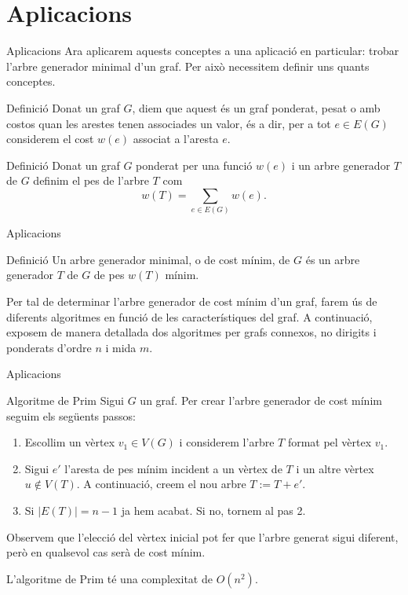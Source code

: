 \documentclass{beamer}
\begin{document}
\section{Aplicacions}
\begin{frame}{Aplicacions}
    Ara aplicarem aquests conceptes a una aplicació en particular: trobar l'arbre generador minimal d'un graf. Per això necessitem definir uns quants conceptes.\pause
    \begin{block}{Definició}
        Donat un graf $G$, diem que aquest és un graf ponderat, pesat o amb costos quan les arestes tenen associades un valor, és a dir, per a tot $e\in E(G)$ considerem el cost $w(e)$ associat a l'aresta $e$.
    \end{block}\pause
    \begin{block}{Definició}
        Donat un graf $G$ ponderat per una funció $w(e)$ i un arbre generador $T$ de $G$ definim el pes de l’arbre $T$ com $$w(T)=\sum_{e\in E(G)} w(e).$$
    \end{block}
\end{frame}
\begin{frame}{Aplicacions}
    \begin{block}{Definició}
        Un arbre generador minimal, o de cost mínim, de $G$ és un arbre generador $T$ de $G$ de pes $w(T)$ mínim.
    \end{block}\pause
    Per tal de determinar l’arbre generador de cost mínim d’un graf, farem ús de diferents algoritmes en funció de les característiques del graf. A continuació, exposem de manera detallada dos algoritmes per grafs connexos, no dirigits i ponderats d’ordre $n$ i mida $m$.
\end{frame}
\begin{frame}{Aplicacions}
    \begin{alertblock}{Algoritme de Prim}
        Sigui $G$ un graf. Per crear l'arbre generador de cost mínim seguim els següents passos:
        \begin{enumerate}
            \item Escollim un vèrtex $v_1\in V(G)$ i considerem l’arbre $T$ format pel vèrtex $v_1$.\pause
            \item Sigui $e'$ l’aresta de pes mínim incident a un vèrtex de $T$ i un altre vèrtex $u\notin V(T)$. A continuació, creem el nou arbre $T:=T+e'$.\pause
            \item Si $|E(T)|=n-1$ ja hem acabat. Si no, tornem al pas 2.
        \end{enumerate}\pause
    \end{alertblock}
    Observem que l’elecció del vèrtex inicial pot fer que l’arbre generat sigui diferent, però en qualsevol cas serà de cost mínim.\pause \par L’algoritme de Prim té una complexitat de $O(n^2)$.
\end{frame}
\end{document}

